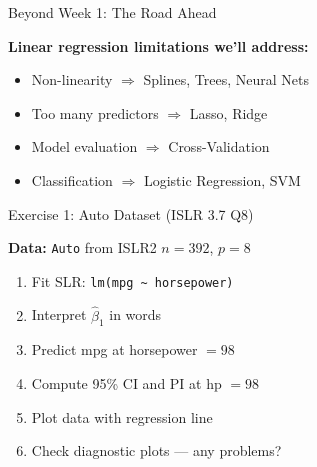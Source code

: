 \documentclass[aspectratio=169, 11pt]{beamer}
\begin{document}
\begin{frame}{Beyond Week 1: The Road Ahead}

\begin{center}
\end{center}

\vspace{0.5em}
\textbf{Linear regression limitations we'll address:}
\begin{itemize}
  \item Non-linearity $\Rightarrow$ Splines, Trees, Neural Nets
  \item Too many predictors $\Rightarrow$ Lasso, Ridge
  \item Model evaluation $\Rightarrow$ Cross-Validation
  \item Classification $\Rightarrow$ Logistic Regression, SVM
\end{itemize}
\end{frame}



\begin{frame}{Exercise 1: Auto Dataset (ISLR 3.7 Q8)}

\textbf{Data:} \texttt{Auto} from ISLR2 \hfill $n = 392$, $p = 8$

\vspace{0.5em}
\begin{enumerate}
  \item Fit SLR: \texttt{lm(mpg \textasciitilde{} horsepower)}
  \item Interpret $\hat{\beta}_1$ in words
  \item Predict mpg at horsepower $= 98$
  \item Compute 95\% CI and PI at hp $= 98$
  \item Plot data with regression line
  \item Check diagnostic plots --- any problems?
\end{enumerate}

\vspace{0.5em}
\end{frame}
\end{document}
